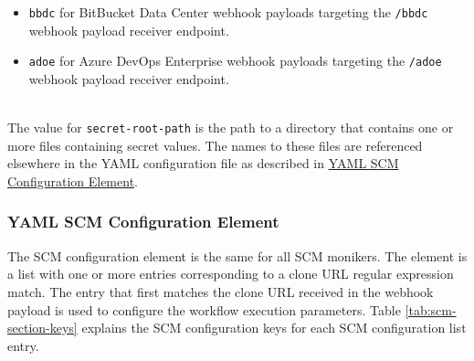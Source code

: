 \begin{itemize}
    \item \texttt{bbdc} for BitBucket Data Center webhook payloads targeting the \texttt{/bbdc}
    webhook payload receiver endpoint.
    \item \texttt{adoe} for Azure DevOps Enterprise webhook payloads targeting the \texttt{/adoe}
    webhook payload receiver endpoint.
\end{itemize}


\noindent\\The value for \texttt{secret-root-path} is the path to a directory that contains one
or more files containing secret values.  The names to these files are referenced elsewhere
in the YAML configuration file as described in
\hyperref[sec:scm-block-element]{YAML SCM Configuration Element}.


\subsubsection{YAML SCM Configuration Element}\label{sec:scm-block-element}

The SCM configuration element is the same for all SCM monikers. The element is a list with
one or more entries corresponding to a clone URL regular expression match.  The entry
that first matches the clone URL received in the webhook payload is used to configure
the workflow execution parameters.  Table \ref{tab:scm-section-keys} explains the SCM
configuration keys for each SCM configuration list entry.

